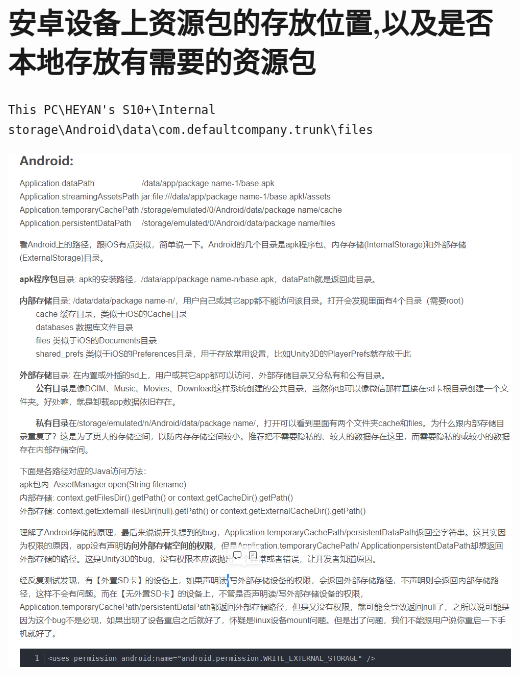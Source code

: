 \documentclass[9pt, b5paper]{article}
\begin{document}
\section{安卓设备上资源包的存放位置,以及是否本地存放有需要的资源包}
\label{sec-9}
\begin{verbatim}
This PC\HEYAN's S10+\Internal storage\Android\data\com.defaultcompany.trunk\files
\end{verbatim}

\includegraphics[width=.9\linewidth]{./pic/unityToAndroid_20221124_135846.png}
\end{document}
